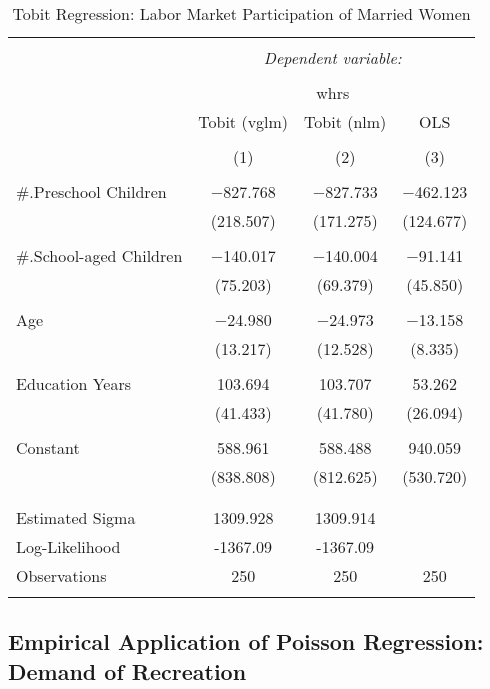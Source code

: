 \documentclass[
  12pt,
]{article}
\begin{document}
\begin{table}[t] \centering 
  \caption{Tobit Regression: Labor Market Participation of Married Women} 
  \label{lfp_tobit} 
\begin{tabular}{@{\extracolsep{5pt}}lccc} 
\\[-1.8ex]\hline 
\hline \\[-1.8ex] 
 & \multicolumn{3}{c}{\textit{Dependent variable:}} \\ 
\cline{2-4} 
\\[-1.8ex] & \multicolumn{3}{c}{whrs} \\ 
 & Tobit (vglm) & Tobit (nlm) & OLS \\ 
\\[-1.8ex] & (1) & (2) & (3)\\ 
\hline \\[-1.8ex] 
 \#.Preschool Children & $-$827.768 & $-$827.733 & $-$462.123 \\ 
  & (218.507) & (171.275) & (124.677) \\ 
  & & & \\ 
 \#.School-aged Children & $-$140.017 & $-$140.004 & $-$91.141 \\ 
  & (75.203) & (69.379) & (45.850) \\ 
  & & & \\ 
 Age & $-$24.980 & $-$24.973 & $-$13.158 \\ 
  & (13.217) & (12.528) & (8.335) \\ 
  & & & \\ 
 Education Years & 103.694 & 103.707 & 53.262 \\ 
  & (41.433) & (41.780) & (26.094) \\ 
  & & & \\ 
 Constant & 588.961 & 588.488 & 940.059 \\ 
  & (838.808) & (812.625) & (530.720) \\ 
  & & & \\ 
\hline \\[-1.8ex] 
Estimated Sigma & 1309.928 & 1309.914 &  \\ 
Log-Likelihood & -1367.09 & -1367.09 &  \\ 
Observations & 250 & 250 & 250 \\ 
\hline 
\hline \\[-1.8ex] 
\end{tabular} 
\end{table}

\hypertarget{empirical-application-of-poisson-regression-demand-of-recreation}{%
\subsection{Empirical Application of Poisson Regression: Demand of Recreation}\label{empirical-application-of-poisson-regression-demand-of-recreation}}
\end{document}
